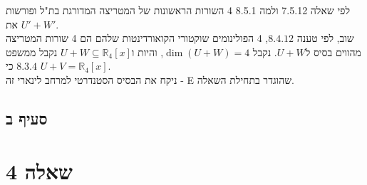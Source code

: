\documentclass{article}
\def\reals{\mathbb{R}}
\begin{document}
לפי שאלה 7.5.12 ולמה 8.5.1 4 השורות הראשונות של המטריצה המדורגת בת"ל ופורשות את $U'+W'$. \\
שוב, לפי טענה $8.4.12$, 4 הפולינומים שוקטורי הקואורדינטות שלהם הם 4 שורות המטריצה מהווים בסיס ל$U+W$.
נקבל $\dim(U+W)=4$, והיות ו$U+W\subseteq \reals_4[x]$ נקבל ממשפט $8.3.4$ כי $U+V=\reals_4[x]$. \\
ניקח את הבסיס הסטנדרטי למרחב לינארי זה - E שהוגדר בתחילת השאלה.

\subsection*{סעיף ב}



\pagebreak

\section*{שאלה 4}
\end{document}
